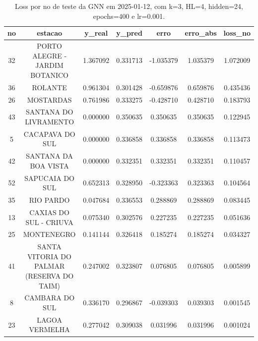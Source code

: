 \begin{table}[h]
\centering
\caption{Loss por no de teste da GNN em 2025-01-12, com k=3, HL=4, hidden=24, epochs=400 e lr=0.001.}
\label{tab:gnn_loss_k3_hl4_h24_e400_d20250112}
\begin{tabular}{ccccccc}
\toprule
no & estacao & y\_real & y\_pred & erro & erro\_abs & loss\_no \\
\midrule
32 & PORTO ALEGRE - JARDIM BOTANICO & 1.367092 & 0.331713 & -1.035379 & 1.035379 & 1.072009 \\
36 & ROLANTE & 0.961304 & 0.301428 & -0.659876 & 0.659876 & 0.435436 \\
26 & MOSTARDAS & 0.761986 & 0.333275 & -0.428710 & 0.428710 & 0.183793 \\
43 & SANTANA DO LIVRAMENTO & 0.000000 & 0.350635 & 0.350635 & 0.350635 & 0.122945 \\
5 & CACAPAVA DO SUL & 0.000000 & 0.336858 & 0.336858 & 0.336858 & 0.113473 \\
42 & SANTANA DA BOA VISTA & 0.000000 & 0.332351 & 0.332351 & 0.332351 & 0.110457 \\
52 & SAPUCAIA DO SUL & 0.652313 & 0.328950 & -0.323363 & 0.323363 & 0.104564 \\
35 & RIO PARDO & 0.047684 & 0.336553 & 0.288869 & 0.288869 & 0.083445 \\
13 & CAXIAS DO SUL - CRIUVA & 0.075340 & 0.302576 & 0.227235 & 0.227235 & 0.051636 \\
25 & MONTENEGRO & 0.141144 & 0.326418 & 0.185274 & 0.185274 & 0.034327 \\
41 & SANTA VITORIA DO PALMAR (RESERVA DO TAIM) & 0.247002 & 0.323807 & 0.076805 & 0.076805 & 0.005899 \\
8 & CAMBARA DO SUL & 0.336170 & 0.296867 & -0.039303 & 0.039303 & 0.001545 \\
23 & LAGOA VERMELHA & 0.277042 & 0.309038 & 0.031996 & 0.031996 & 0.001024 \\
\bottomrule
\end{tabular}
\end{table}
